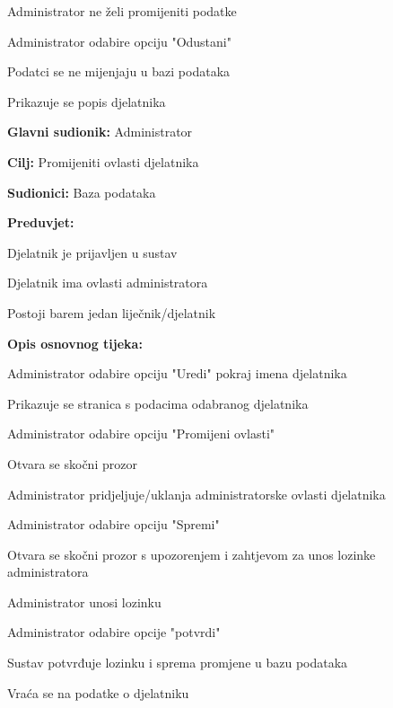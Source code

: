 \begin{packed_item}
\begin{packed_item}
						\item[4.a] Administrator ne želi promijeniti podatke 
						\item[] \begin{packed_enum}
							\item Administrator odabire opciju "Odustani"
							\item Podatci se ne mijenjaju u bazi podataka
							\item Prikazuje se popis djelatnika							
						\end{packed_enum}
					\end{packed_item}
				\end{packed_item}
				
				
				\noindent {}
				\begin{packed_item}
					
					\item \textbf{Glavni sudionik: }Administrator
					\item  \textbf{Cilj: }Promijeniti ovlasti djelatnika
					\item  \textbf{Sudionici: }Baza podataka
					\item  \textbf{Preduvjet: }
					\item[] \begin{packed_enum}
						
						\item[-] Djelatnik je prijavljen u sustav
						\item[-] Djelatnik ima ovlasti administratora
						\item[-] Postoji barem jedan liječnik/djelatnik
					\end{packed_enum}
					\item  \textbf{Opis osnovnog tijeka: }
					
					\item[] \begin{packed_enum}
						\item Administrator odabire opciju "Uredi" pokraj imena djelatnika
						\item Prikazuje se stranica s podacima odabranog djelatnika
						\item Administrator odabire opciju "Promijeni ovlasti"
						\item Otvara se skočni prozor 
						\item Administrator pridjeljuje/uklanja administratorske ovlasti djelatnika
						\item Administrator odabire opciju "Spremi"
						\item Otvara se skočni prozor s upozorenjem i zahtjevom za unos lozinke administratora
						\item Administrator unosi lozinku
						\item Administrator odabire opcije "potvrdi"
						\item Sustav potvrđuje lozinku i sprema promjene u bazu podataka
						\item Vraća se na podatke o djelatniku
					\end{packed_enum}
					

\end{packed_item}
